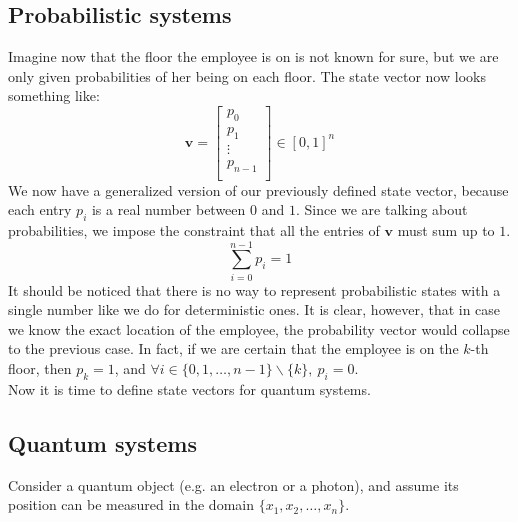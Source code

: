 \documentclass[12pt,a4paper]{report}
\theoremstyle{definition}
\theoremstyle{definition}
\theoremstyle{definition}
\begin{document}
\subsection{Probabilistic systems}
Imagine now that the floor the employee is on is not known for sure, but we are only given probabilities of her being on each floor. The state vector now looks something like:
\begin{equation*}
    \mathbf{v}=\begin{bmatrix}
        p_0\\
        p_1\\
        \vdots\\
        p_{n-1}\\
    \end{bmatrix}\in [0,1]^n
\end{equation*}
We now have a generalized version of our previously defined state vector, because each entry $p_i$ is a real number between $0$ and $1$. Since we are talking about probabilities, we impose the constraint that all the entries of $\mathbf{v}$ must sum up to $1$.
\begin{equation*}
    \sum_{i=0}^{n-1} p_i = 1
\end{equation*}
It should be noticed that there is no way to represent probabilistic states with a single number like we do for deterministic ones. It is clear, however, that in case we know the exact location of the employee, the probability vector would collapse to the previous case. In fact, if we are certain that the employee is on the $k$-th floor, then $p_k=1$, and $\forall i \in \{0,1,\ldots,n-1\} \smallsetminus \{k\},\ p_i=0$.\\
Now it is time to define state vectors for quantum systems.\\




\subsection{Quantum systems}
Consider a quantum object (e.g. an electron or a photon), and assume its position can be measured in the domain $\{x_1, x_2, \ldots, x_n\}$.\\
\begin{center}
\end{center}
\end{document}

